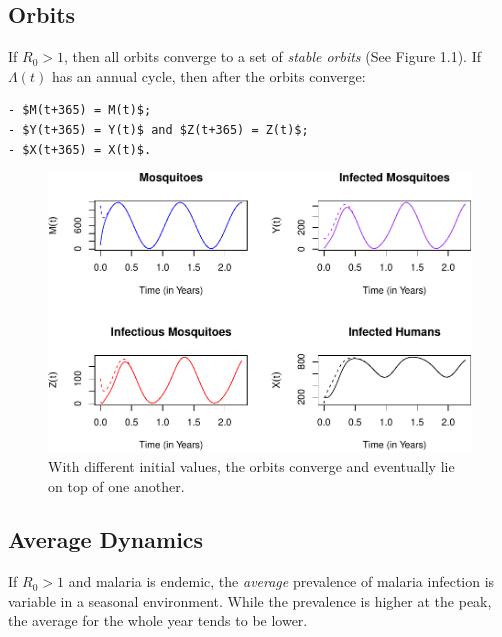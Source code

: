 \documentclass[
]{book}
\begin{document}
\clearpage

\subsection{Orbits}\label{orbits}

If \(R_0 >1\), then all orbits converge to a set of \emph{stable orbits} (See Figure 1.1). If \(\Lambda(t)\) has an annual cycle, then after the orbits converge:

\begin{verbatim}
- $M(t+365) = M(t)$; 
- $Y(t+365) = Y(t)$ and $Z(t+365) = Z(t)$; 
- $X(t+365) = X(t)$. 
\end{verbatim}

\begin{figure}
\centering
\includegraphics{docs/figs/unnamed-chunk-85-1.pdf}
\caption{\label{fig:unnamed-chunk-85}With different initial values, the orbits converge and eventually lie on top of one another.}
\end{figure}

\clearpage

\subsection{Average Dynamics}\label{average-dynamics}

If \(R_0>1\) and malaria is endemic, the \emph{average} prevalence of malaria infection is variable in a seasonal environment. While the prevalence is higher at the peak, the average for the whole year tends to be lower.
\end{document}
